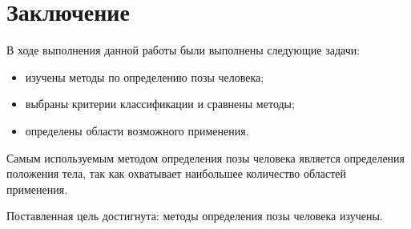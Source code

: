 \chapter*{Заключение}

В ходе выполнения данной работы были выполнены следующие задачи:
\begin{itemize}
	\item изучены методы по определению позы человека;
	\item выбраны критерии классификации и сравнены методы;
	\item определены области возможного применения.
\end{itemize}

Самым используемым методом определения позы человека является определения положения тела, так как охватывает наибольшее количество областей применения.

Поставленная цель достигнута: методы определения позы человека изучены.